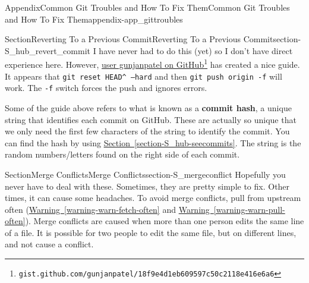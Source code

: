 \documentclass[oneside,10pt,]{book}
\newcommand{\xreffont}{\relax}
\newcommand{\mono}[1]{\texttt{#1}}
\newcommand{\terminology}[1]{\textbf{#1}}
\begin{document}
\begin{appendixptx}{Appendix}{Common Git Troubles and How To Fix Them}{}{Common Git Troubles and How To Fix Them}{}{}{appendix-app_gittroubles}
%
%
\typeout{************************************************}
\typeout{************************************************}
%
\begin{sectionptx}{Section}{Reverting To a Previous Commit}{}{Reverting To a Previous Commit}{}{}{section-S_hub_revert_commit}
%
%
%
%
%
I have never had to do this (yet) so I don't have direct experience here. However, \href{https://gist.github.com/gunjanpatel/18f9e4d1eb609597c50c2118e416e6a6}{user gunjanpatel on GitHub}\footnote{\nolinkurl{gist.github.com/gunjanpatel/18f9e4d1eb609597c50c2118e416e6a6}\label{fn-S_hub_revert_commit-g-b}} has created a nice guide. It appears that \mono{git reset HEAD\textasciicircum{} --hard} and then \mono{git push origin -f} will work. The \mono{-f} switch forces the push and ignores errors.%
\par
Some of the guide above refers to what is known as a \terminology{commit hash}, a unique string that identifies each commit on GitHub. These are actually so unique that we only need the first few characters of the string to identify the commit. You can find the hash by using \hyperref[section-S_hub-seecommits]{Section~{\xreffont\ref{section-S_hub-seecommits}}}. The string is the random numbers\slash{}letters found on the right side of each commit.%
\end{sectionptx}
%
%
\typeout{************************************************}
\typeout{************************************************}
%
\begin{sectionptx}{Section}{Merge Conflicts}{}{Merge Conflicts}{}{}{section-S_mergeconflict}
Hopefully you never have to deal with these. Sometimes, they are pretty simple to fix. Other times, it can cause some headaches. To avoid merge conflicts, pull from upstream often (\hyperref[warning-warn-fetch-often]{Warning~{\xreffont\ref{warning-warn-fetch-often}}} and \hyperref[warning-warn-pull-often]{Warning~{\xreffont\ref{warning-warn-pull-often}}}). Merge conflicts are caused when more than one person edits the same line of a file. It is possible for two people to edit the same file, but on different lines, and not cause a conflict.%
\par

\end{sectionptx}
\end{appendixptx}
\end{document}

